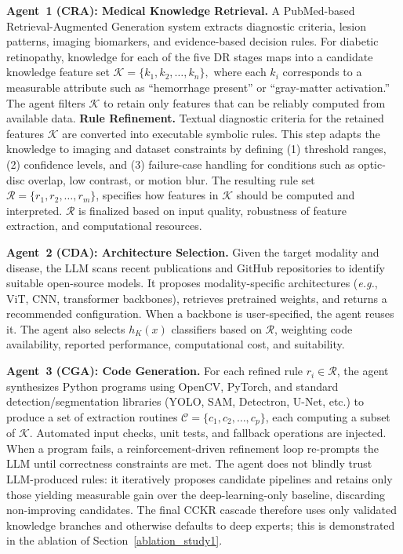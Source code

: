 \documentclass{article}
\newcommand{\eg}{\textit{e.g.}}
\begin{document}
\textbf{Agent~1 (CRA): Medical Knowledge Retrieval.}
A PubMed-based Retrieval-Augmented Generation system extracts diagnostic
criteria, lesion patterns, imaging biomarkers, and evidence-based decision
rules. For diabetic retinopathy, knowledge for each of the five DR stages
maps into a candidate knowledge feature set $\mathcal{K} = \{k_1, k_2, \dots, k_n\},$
where each $k_i$ corresponds to a measurable attribute such as
``hemorrhage present'' or ``gray-matter activation.'' The agent filters
$\mathcal{K}$ to retain only features that can be reliably computed from
available data. \textbf{Rule Refinement.}
Textual diagnostic criteria for the retained features $\mathcal{K}$ are
converted into executable symbolic rules. This step adapts the knowledge to
imaging and dataset constraints by defining (1) threshold ranges,
(2) confidence levels, and (3) failure-case handling for conditions such
as optic-disc overlap, low contrast, or motion blur. The resulting rule set $\mathcal{R} = \{r_1, r_2, \dots, r_m\}$,
specifies how features in $\mathcal{K}$ should be computed and interpreted.
$\mathcal{R}$ is finalized based on input quality, robustness of feature
extraction, and computational resources.

\textbf{Agent~2 (CDA): Architecture Selection.}
Given the target modality and disease, the LLM scans recent publications
and GitHub repositories to identify suitable open-source models. It
proposes modality-specific architectures (\eg, ViT, CNN, transformer
backbones), retrieves pretrained weights, and returns a recommended
configuration. When a backbone is user-specified, the agent reuses it. The
agent also selects $h_K(x)$ classifiers based on $\mathcal{R}$, weighting
code availability, reported performance, computational cost, and
suitability.

\textbf{Agent~3 (CGA): Code Generation.}
For each refined rule $r_i \in \mathcal{R}$, the agent synthesizes Python
programs using OpenCV, PyTorch, and standard detection/segmentation
libraries (YOLO, SAM, Detectron, U-Net, etc.) to produce a set of
extraction routines $\mathcal{C} = \{c_1, c_2, \dots, c_p\}$, each computing a subset of $\mathcal{K}$. Automated input checks, unit
tests, and fallback operations are injected. When a program fails, a
reinforcement-driven refinement loop re-prompts the LLM until correctness
constraints are met. The agent does not blindly trust LLM-produced rules:
it iteratively proposes candidate pipelines and retains only those yielding
measurable gain over the deep-learning-only baseline, discarding
non-improving candidates. The final CCKR cascade therefore uses only
validated knowledge branches and otherwise defaults to deep experts; this
is demonstrated in the ablation of Section~\ref{ablation_study1}.
\vspace{-1.5pt}
\end{document}
